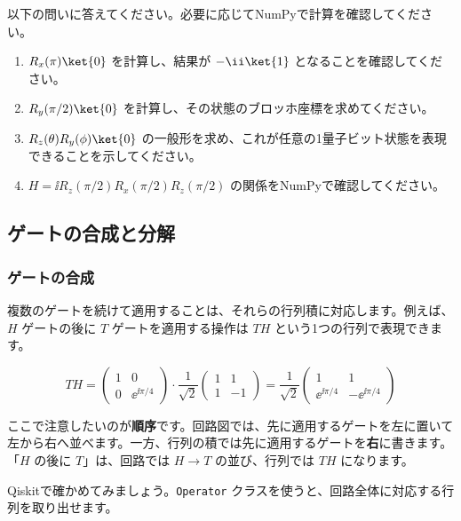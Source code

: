 \begin{exercise}[回転ゲートの確認]
以下の問いに答えてください。必要に応じてNumPyで計算を確認してください。

\begin{enumerate}
\item $R_x(\pi) \ket{0}$ を計算し、結果が $-\ii\ket{1}$ となることを確認してください。
\item $R_y(\pi/2) \ket{0}$ を計算し、その状態のブロッホ座標を求めてください。
\item $R_z(\theta) R_y(\phi) \ket{0}$ の一般形を求め、これが任意の1量子ビット状態を表現できることを示してください。
\item $H = \ii R_z(\pi/2) R_x(\pi/2) R_z(\pi/2)$ の関係をNumPyで確認してください。
\end{enumerate}
\end{exercise}

\subsection{ゲートの合成と分解}

\subsubsection{ゲートの合成}

複数のゲートを続けて適用することは、それらの行列積に対応します。例えば、$H$ ゲートの後に $T$ ゲートを適用する操作は $T H$ という1つの行列で表現できます。

\[
T H = \begin{pmatrix} 1 & 0 \\ 0 & \ee^{\ii\pi/4} \end{pmatrix} \cdot
\frac{1}{\sqrt{2}} \begin{pmatrix} 1 & 1 \\ 1 & -1 \end{pmatrix}
= \frac{1}{\sqrt{2}} \begin{pmatrix} 1 & 1 \\ \ee^{\ii\pi/4} & -\ee^{\ii\pi/4} \end{pmatrix}
\]

ここで注意したいのが\textbf{順序}です。回路図では、先に適用するゲートを左に置いて左から右へ並べます。一方、行列の積では先に適用するゲートを\textbf{右}に書きます。「$H$ の後に $T$」は、回路では $H \to T$ の並び、行列では $T H$ になります。

Qiskitで確かめてみましょう。\texttt{Operator} クラスを使うと、回路全体に対応する行列を取り出せます。

